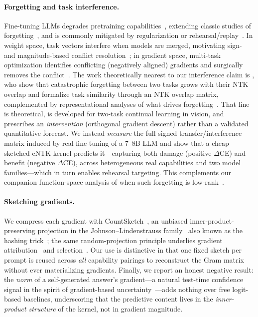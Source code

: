 \paragraph{Forgetting and task interference.}
Fine-tuning LLMs degrades pretraining capabilities~\citep{luo2023empirical,kotha2024understanding},
extending classic studies of forgetting~\citep{kirkpatrick2017ewc,toneva2019empirical}, and
is commonly mitigated by regularization or rehearsal/replay~\citep{scialom2022finetuned,huang2024selfsynth}.
In weight space, task vectors interfere when models are merged, motivating sign- and
magnitude-based conflict resolution~\citep{ilharco2023task,yadav2023ties}; in gradient space,
multi-task optimization identifies conflicting (negatively aligned) gradients and surgically
removes the conflict~\citep{yu2020pcgrad,wang2021gradvaccine,du2018adapting}. The work
theoretically nearest to our interference claim is \citet{doan2021ntkoverlap}, who show that
catastrophic forgetting between two tasks grows with their NTK overlap and formalize task
similarity through an NTK overlap matrix, complemented by representational analyses of what
drives forgetting~\citep{ramasesh2021anatomy}. That line is theoretical, is developed for
two-task continual learning in vision, and prescribes an \emph{intervention} (orthogonal
gradient descent) rather than a validated quantitative forecast. We instead \emph{measure}
the full signed transfer/interference matrix induced by real fine-tuning of a 7--8B LLM and
show that a cheap sketched-eNTK kernel predicts it---capturing both damage (positive
$\Delta$CE) and benefit (negative $\Delta$CE), across heterogeneous real capabilities and two
model families---which in turn enables rehearsal targeting. This complements our companion
function-space analysis of when such forgetting is low-rank~\citep{hidekel2026forgetting}.

\paragraph{Sketching gradients.}
We compress each gradient with CountSketch~\citep{charikar2002countsketch}, an unbiased
inner-product-preserving projection in the Johnson--Lindenstrauss family~\citep{johnson1984extensions}
also known as the hashing trick~\citep{weinberger2009feature}; the same random-projection
principle underlies gradient attribution~\citep{park2023trak} and selection~\citep{xia2024less}.
Our use is distinctive in that one fixed sketch per prompt is reused across \emph{all}
capability pairings to reconstruct the Gram matrix without ever materializing gradients.
Finally, we report an honest negative result: the \emph{norm} of a self-generated answer's
gradient---a natural test-time confidence signal in the spirit of gradient-based
uncertainty~\citep{lee2020gradients}---adds nothing over free logit-based baselines, underscoring
that the predictive content lives in the \emph{inner-product structure} of the kernel, not in
gradient magnitude.
